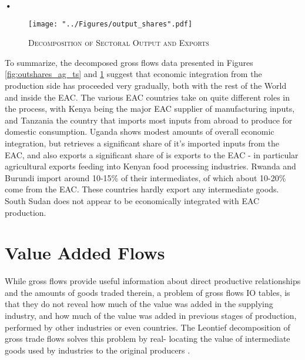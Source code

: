 \textbf{\textbf{•}}\documentclass[a4paper]{article}
\begin{document}
\begin{figure}[!h]
\centering
\vspace{-2cm}
\caption{\label{fig:outshares}\textsc{Decomposition of Sectoral Output and Exports}}
\vspace*{\fill}
\begin{adjustbox}{center}
\texttt{[image: "../Figures/output\_shares".pdf]} %
\end{adjustbox}
\vspace*{\fill}
\end{figure}
\FloatBarrier

To summarize, the decomposed gross flows data presented in Figures \ref{fig:outshares_ag_ts} and \ref{fig:outshares} suggest that economic integration from the production side has proceeded very gradually, both with the rest of the World and inside the EAC. The various EAC countries take on quite different roles in the process, with Kenya being the major EAC supplier of manufacturing inputs, and Tanzania the country that imports most inputs from abroad to produce for domestic consumption. Uganda shows modest amounts of overall economic integration, but retrieves a significant share of it's imported inputs from the EAC, and also exports a significant share of is exports to the EAC - in particular agricultural exports feeding into Kenyan food processing industries. Rwanda and Burundi import around 10-15\% of their intermediates, of which about 10-20\% come from the EAC. These countries hardly export any intermediate goods. South Sudan does not appear to be economically integrated with EAC production. 


\section{Value Added Flows}
While gross flows provide useful information about direct productive relationships and the amounts of goods traded therein, a problem of gross flows IO tables, is that they do not reveal how much of the value was added in the supplying industry, and how much of the value was added in previous stages of production, performed by other industries or even countries. %
The Leontief decomposition of gross trade flows solves this problem by real-
locating the value of intermediate goods used by industries to the original producers \citep{Kummritz2014}. %
\end{document}
